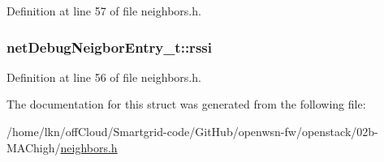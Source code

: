 Definition at line 57 of file neighbors.\+h.

\subsubsection[{\texorpdfstring{rssi}{rssi}}]{ net\+Debug\+Neigbor\+Entry\+\_\+t\+::rssi}\hypertarget{structnet_debug_neigbor_entry__t_a60fc35dde6926b216d6458b59416aa40}{}\label{structnet_debug_neigbor_entry__t_a60fc35dde6926b216d6458b59416aa40}


Definition at line 56 of file neighbors.\+h.



The documentation for this struct was generated from the following file\+:\begin{DoxyCompactItemize}
\item 
/home/lkn/off\+Cloud/\+Smartgrid-\/code/\+Git\+Hub/openwsn-\/fw/openstack/02b-\/\+M\+A\+Chigh/\hyperlink{neighbors_8h}{neighbors.\+h}\end{DoxyCompactItemize}
